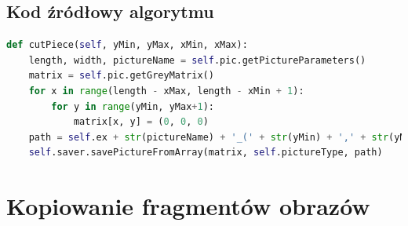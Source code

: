 \documentclass[a4paper,12pt, titlepage]{report}
\begin{document}
\FloatBarrier
\subsection*{Kod źródłowy algorytmu}
\begin{lstlisting}[language=Python]
def cutPiece(self, yMin, yMax, xMin, xMax):
    length, width, pictureName = self.pic.getPictureParameters()
    matrix = self.pic.getGreyMatrix()
    for x in range(length - xMax, length - xMin + 1):
        for y in range(yMin, yMax+1):
            matrix[x, y] = (0, 0, 0)
    path = self.ex + str(pictureName) + '_(' + str(yMin) + ',' + str(yMax) + '),(' + str(xMin) + ',' + str(xMax) + ').png'
    self.saver.savePictureFromArray(matrix, self.pictureType, path)
\end{lstlisting}

\section{Kopiowanie fragmentów obrazów}
\end{document}
